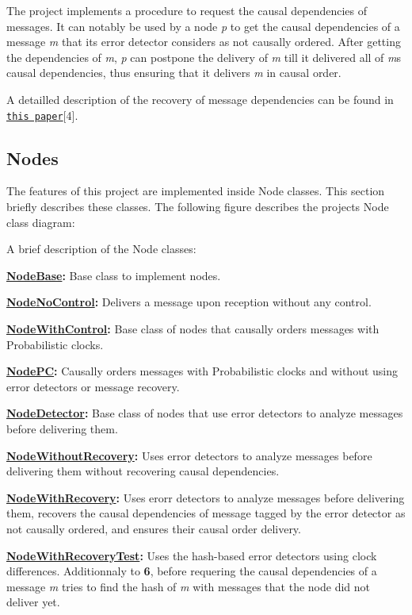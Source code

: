 The project implements a procedure to request the causal dependencies of messages. It can notably be used by a node {\itshape p} to get the causal dependencies of a message {\itshape m} that its error detector considers as not causally ordered. After getting the dependencies of {\itshape m}, {\itshape p} can postpone the delivery of {\itshape m} till it delivered all of {\itshape m}\textquotesingle{}s causal dependencies, thus ensuring that it delivers {\itshape m} in causal order.

A detailled description of the recovery of message dependencies can be found in \href{https://hal.science/hal-03984499}{\tt this paper}\mbox{[}4\mbox{]}.

\subsection*{Nodes}

The features of this project are implemented inside Node classes. This section briefly describes these classes. The following figure describes the project\textquotesingle{}s Node class diagram\+: 

A brief description of the Node classes\+:
\begin{DoxyEnumerate}
\item {\bfseries \hyperlink{class_node_base}{Node\+Base}\+:} Base class to implement nodes.
\item {\bfseries \hyperlink{class_node_no_control}{Node\+No\+Control}\+:} Delivers a message upon reception without any control.
\item {\bfseries \hyperlink{class_node_with_control}{Node\+With\+Control}\+:} Base class of nodes that causally orders messages with Probabilistic clocks.
\item {\bfseries \hyperlink{class_node_p_c}{Node\+PC}\+:} Causally orders messages with Probabilistic clocks and without using error detectors or message recovery.
\item {\bfseries \hyperlink{class_node_detector}{Node\+Detector}\+:} Base class of nodes that use error detectors to analyze messages before delivering them.
\item {\bfseries \hyperlink{class_node_without_recovery}{Node\+Without\+Recovery}\+:} Uses error detectors to analyze messages before delivering them without recovering causal dependencies.
\item {\bfseries \hyperlink{class_node_with_recovery}{Node\+With\+Recovery}\+:} Uses erorr detectors to analyze messages before delivering them, recovers the causal dependencies of message tagged by the error detector as not causally ordered, and ensures their causal order delivery.
\item {\bfseries \hyperlink{class_node_with_recovery_test}{Node\+With\+Recovery\+Test}\+:} Uses the hash-\/based error detectors using clock differences. Additionnaly to {\bfseries 6}, before requering the causal dependencies of a message {\itshape m} tries to find the hash of {\itshape m} with messages that the node did not deliver yet.
\end{DoxyEnumerate}

